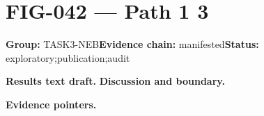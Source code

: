 \clearpage
\section{FIG-042 --- Path 1 3}
\label{figpage:fig-042}
\textbf{Group:} TASK3-NEB\quad \textbf{Evidence chain:} manifested\quad \textbf{Status:} exploratory;publication;audit

\textbf{Results text draft.} 
\textbf{Discussion and boundary.} 


\textbf{Evidence pointers.}



\vfill
